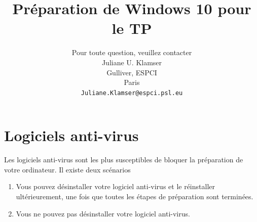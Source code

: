 \documentclass{article}
\title{Préparation de Windows 10 pour le TP}
\author{
Pour toute question, veuillez contacter\\
 Juliane U. Klamser\\%
  Gulliver,  ESPCI\\
  Paris \\
  \texttt{Juliane.Klamser@espci.psl.eu} \\
}
\begin{document}
\maketitle

\tableofcontents



\section{Logiciels anti-virus}
Les logiciels anti-virus sont les plus susceptibles de bloquer la préparation de votre ordinateur. Il existe deux scénarios
\begin{enumerate}
\item Vous pouvez désinstaller votre logiciel anti-virus et le réinstaller ultérieurement, une fois que toutes les étapes de préparation sont terminées.
\item Vous ne pouvez pas désinstaller votre logiciel anti-virus.
\end{enumerate}
\end{document}
